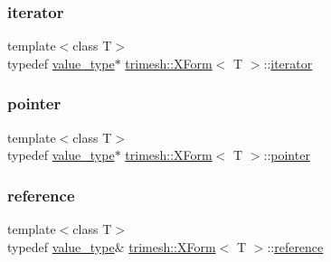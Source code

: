 \mbox{\label{classtrimesh_1_1XForm_a8894e55e986e53231663e774060ca200}} 
\subsubsection{\texorpdfstring{iterator}{iterator}}
{\footnotesize\ttfamily template$<$class T$>$ \\
typedef \hyperlink{classtrimesh_1_1XForm_af259af02eaea86d3451dc23a47ad896c}{value\+\_\+type}$\ast$ \hyperlink{classtrimesh_1_1XForm}{trimesh\+::\+X\+Form}$<$ T $>$\+::\hyperlink{classtrimesh_1_1XForm_a8894e55e986e53231663e774060ca200}{iterator}}

\mbox{\label{classtrimesh_1_1XForm_a0ff7a6cb20d209f32be3ab3779077029}} 
\subsubsection{\texorpdfstring{pointer}{pointer}}
{\footnotesize\ttfamily template$<$class T$>$ \\
typedef \hyperlink{classtrimesh_1_1XForm_af259af02eaea86d3451dc23a47ad896c}{value\+\_\+type}$\ast$ \hyperlink{classtrimesh_1_1XForm}{trimesh\+::\+X\+Form}$<$ T $>$\+::\hyperlink{classtrimesh_1_1XForm_a0ff7a6cb20d209f32be3ab3779077029}{pointer}}

\mbox{\label{classtrimesh_1_1XForm_afef5285ff7d9ea2e25a4bb4d966bd674}} 
\subsubsection{\texorpdfstring{reference}{reference}}
{\footnotesize\ttfamily template$<$class T$>$ \\
typedef \hyperlink{classtrimesh_1_1XForm_af259af02eaea86d3451dc23a47ad896c}{value\+\_\+type}\& \hyperlink{classtrimesh_1_1XForm}{trimesh\+::\+X\+Form}$<$ T $>$\+::\hyperlink{classtrimesh_1_1XForm_afef5285ff7d9ea2e25a4bb4d966bd674}{reference}}


